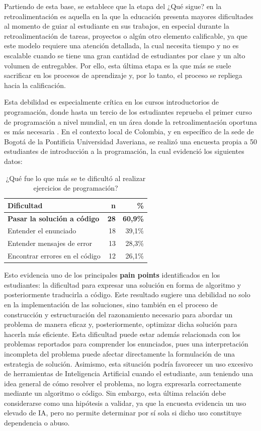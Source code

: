 \documentclass[letterpaper, 10 pt, conference]{ieeeconf}
\begin{document}
Partiendo de esta base, se establece que la etapa del ¿Qué sigue? en la retroalimentación es aquella en la que la educación presenta mayores dificultades al momento de guiar al estudiante en sus trabajos, en especial durante la retroalimentación de tareas, proyectos o algún otro elemento calificable, ya que este modelo requiere una atención detallada, la cual necesita tiempo y no es escalable cuando se tiene una gran cantidad de estudiantes por clase y un alto volumen de entregables. Por ello, esta última etapa es la que más se suele sacrificar en los procesos de aprendizaje y, por lo tanto, el proceso se repliega hacia la calificación. 

Esta debilidad es especialmente crítica en los cursos introductorios de programación, donde hasta un tercio de los estudiantes reprueba el primer curso de programación a nivel mundial, en un área donde la retroalimentación oportuna es más necesaria \cite{24}. En el contexto local de Colombia, y en específico de la sede de Bogotá de la Pontificia Universidad Javeriana, se realizó una encuesta propia a 50 estudiantes de introducción a la programación, la cual evidenció los siguientes datos:

\begin{table}[ht]
	\centering
	\caption{¿Qué fue lo que más se te dificultó al realizar ejercicios de programación?}
	\label{tab:dificultades}
	\begin{tabular}{lrr}
		\hline
		\textbf{Dificultad} & \textbf{n} & \textbf{\%} \\
		\hline
		\textbf{Pasar la solución a código} & \textbf{28} & \textbf{60,9\%} \\
		Entender el enunciado & 18 & 39,1\% \\
		Entender mensajes de error & 13 & 28,3\% \\
		Encontrar errores en el código & 12 & 26,1\% \\
		\hline
	\end{tabular}
\end{table}

Esto evidencia uno de los principales \textbf{pain points} identificados en los estudiantes: la dificultad para expresar una solución en forma de algoritmo y posteriormente traducirla a código. Este resultado sugiere una debilidad no solo en la implementación de las soluciones, sino también en el proceso de construcción y estructuración del razonamiento necesario para abordar un problema de manera eficaz y, posteriormente, optimizar dicha solución para hacerla más eficiente. Esta dificultad puede estar además relacionada con los problemas reportados para comprender los enunciados, pues una interpretación incompleta del problema puede afectar directamente la formulación de una estrategia de solución. Asimismo, esta situación podría favorecer un uso excesivo de herramientas de Inteligencia Artificial cuando el estudiante, aun teniendo una idea general de cómo resolver el problema, no logra expresarla correctamente mediante un algoritmo o código. Sin embargo, esta última relación debe considerarse como una hipótesis a validar, ya que la encuesta evidencia un uso elevado de IA, pero no permite determinar por sí sola si dicho uso constituye dependencia o abuso.
\end{document}
